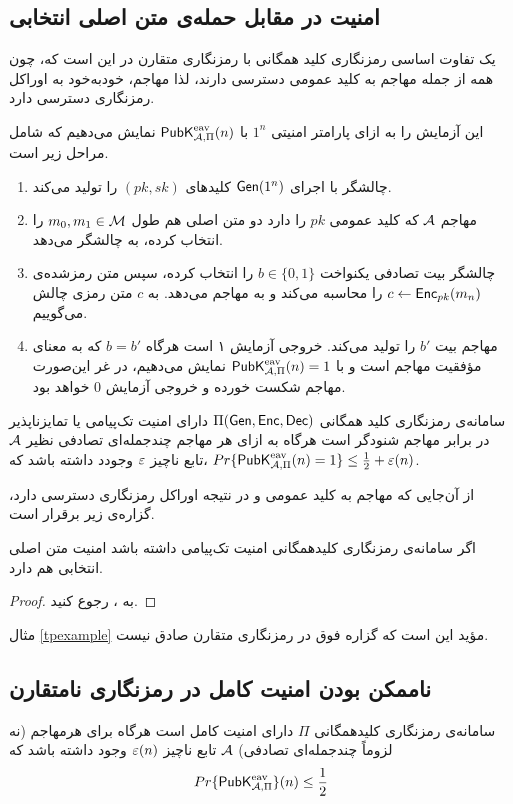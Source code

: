 \subsection*{امنیت در مقابل حمله‌ی متن اصلی انتخابی}
یک تفاوت اساسی رمزنگاری کلید همگانی با رمزنگاری متقارن در این است که، چون همه‌ از جمله مهاجم به کلید عمومی دسترسی دارند، لذا مهاجم، خودبه‌خود به اوراکل رمزنگاری دسترسی دارد.
\begin{definition}
	این آزمایش را به ازای پارامتر امنیتی 
	$1^{n}$
	با 
	$\mathsf{PubK}_{\mathcal{A},\Pi}^{\textup{eav}}(n)$
	نمایش می‌دهیم که شامل مراحل زیر است.
\begin{enumerate}
\item
چالشگر با اجرای 
$\mathsf{Gen}(1^{n})$
کلید‌های 
$(pk, sk)$
را تولید می‌کند.
\item
مهاجم 
$\mathcal{A}$
که کلید عمومی 
$pk$
را دارد دو متن اصلی هم طول 
$m_{0}, m_{1}\in{\mathcal M}$
را انتخاب کرده، به چالشگر می‌دهد.
\item
چالشگر بیت تصادفی یکنواخت 
$b\in\{0, 1\}$
را انتخاب کرده، سپس متن رمزشده‌ی 
$c\leftarrow\mathsf{Enc}_{pk}(m_{n})$
را محاسبه می‌کند و به مهاجم می‌دهد. به 
$c$
متن رمزی چالش می‌گوییم.
\item
مهاجم بیت 
$b'$
را تولید می‌کند. خروجی آزمایش ۱ است هرگاه 
$b = b'$
که به معنای مؤفقیت مهاجم است و با 
$\mathsf{PubK}_{\mathcal{A},\Pi}^{\textup{eav}}(n) = 1$
نمایش می‌دهیم، در غر این‌صورت مهاجم شکست خورده و خروجی آزمایش 
$0$
خواهد بود. 
\end{enumerate}
\end{definition}
\begin{definition}
سامانه‌ی رمزنگاری کلید همگانی 
$\Pi(\mathsf{Gen}, \mathsf{Enc}, \mathsf{Dec})$
دارای امنیت تک‌‌پیامی یا تمایزناپذیر در برابر مهاجم شنودگر است هرگاه به ازای هر مهاجم چندجمله‌ای تصادفی نظیر 
$\mathcal{A}$
تابع ناچیز 
$\varepsilon$
وجودد داشته باشد که، 
$Pr\{\mathsf{PubK}_{\mathcal{A},\Pi}^{\textup{eav}}(n) = 1\}\leq \frac{1}{2} + \varepsilon(n)$.
\end{definition}
از آن‌جایی که مهاجم به کلید عمومی و در نتیجه اوراکل رمزنگاری دسترسی دارد، گزاره‌ی زیر برقرار است.
\begin{proposition}
	اگر سامانه‌ی رمزنگاری کلیدهمگانی امنیت تک‌پیامی داشته باشد امنیت متن اصلی انتخابی هم دارد.
\end{proposition}
\begin{proof}
به 
{\small \cite{katz2014introduction}}، 
رجوع کنید. 
\end{proof}
مثال 
\ref{tpexample}
مؤید این است که گزاره فوق در رمزنگاری متقارن صادق نیست.
\subsection*{ناممکن بودن امنیت کامل در رمزنگاری نامتقارن}
\begin{definition}
سامانه‌ی رمزنگاری کلیدهمگانی 
$\Pi$
دارای امنیت کامل است هرگاه برای هرمهاجم (نه لزوماً چندجمله‌ای تصادفی) 
$\mathcal{A}$
تابع ناچیز 
$\varepsilon(n)$
وجود داشته باشد که
$$Pr\{\mathsf{PubK}_{\mathcal{A},\Pi}^{\textup{eav}}\}(n)\leq \frac{1}{2}$$
\end{definition}

